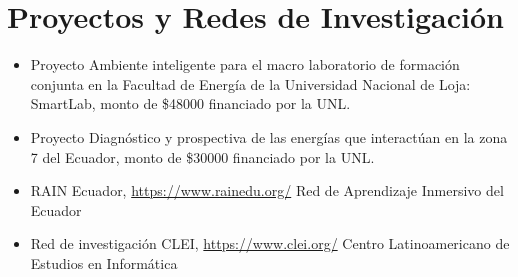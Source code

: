 \documentclass[]{cv-style} %
\begin{document}
\section{Proyectos y Redes de Investigación}
\vspace{-0.3cm}
\begin{itemize}
    \item  \small Proyecto Ambiente inteligente para el macro laboratorio de formación conjunta en la Facultad de Energía de la Universidad Nacional de Loja: SmartLab, monto de \$48000 financiado por la UNL.
    \item \small Proyecto Diagnóstico y prospectiva de las energías que interactúan en la zona 7 del Ecuador, monto de \$30000 financiado por la UNL.
    \item \small RAIN Ecuador, \url{https://www.rainedu.org/} Red de Aprendizaje Inmersivo del Ecuador
    \item \small Red de investigación CLEI, \url{https://www.clei.org/} Centro Latinoamericano de Estudios en Informática
\end{itemize}
\end{document}
